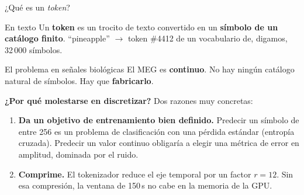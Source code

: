 \documentclass[aspectratio=169,10pt]{beamer}
\newcommand{\term}[1]{\textbf{\color{deepgreen}#1}}
\newcommand{\eng}[1]{{\itshape\color{muted}#1}}
\begin{document}
\begin{frame}[c]{¿Qué es un \eng{token}?}
  \small
  \begin{block}{En texto}
    Un \term{token} es un trocito de texto convertido en un \term{símbolo de un catálogo finito}. ``pineapple'' $\rightarrow$ token \#4412 de un vocabulario de, digamos, 32\,000 símbolos.
  \end{block}
  \vspace{1mm}
  \begin{alertblock}{El problema en señales biológicas}
    El MEG es \term{continuo}. No hay ningún catálogo natural de símbolos. Hay que \term{fabricarlo}.
  \end{alertblock}
  \vspace{1mm}
  \textbf{¿Por qué molestarse en discretizar?} Dos razones muy concretas:
  \begin{enumerate}
    \item \term{Da un objetivo de entrenamiento bien definido.} Predecir un símbolo de entre 256 es un problema de clasificación con una pérdida estándar (entropía cruzada). Predecir un valor continuo obligaría a elegir una métrica de error en amplitud, dominada por el ruido.
    \item \term{Comprime.} El tokenizador reduce el eje temporal por un factor $r = 12$. Sin esa compresión, la ventana de 150\,s no cabe en la memoria de la GPU.
  \end{enumerate}
\end{frame}
\end{document}
